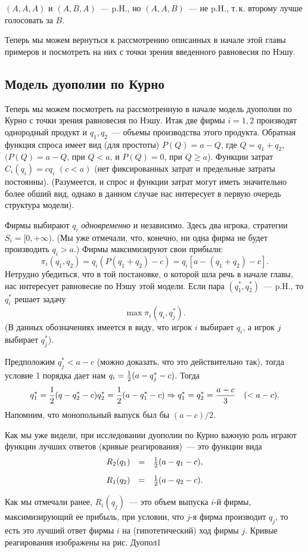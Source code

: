 {$(A,A,A)$ и $(A,B,A)$~--- p.H.,  но $(A,A,B)$~--- не p.H., т.\,к.
второму лучше голосовать за $B$.

Теперь мы можем вернуться к рассмотрению описанных в начале этой
главы примеров и посмотреть на них с точки зрения введенного
равновесия по Нэшу.

\subsection{Модель дуополии по Курно}


Теперь мы можем посмотреть на рассмотренную в начале модель
дуополии по Курно с точки зрения равновесия по Нэшу.
Итак две фирмы $i=1,2$ производят однородный продукт и $q_1,q_2$~---
объемы производства этого продукта. Обратная функция спроса имеет
вид (для простоты) $P(Q)=a-Q$, где $Q=q_1+q_2$, $(P(Q)=a-Q$, при
$Q<a$, и $P(Q)=0$, при $Q\ge a$).  Функции затрат $C_i(q_i)=cq_i$
$(c<a)$ (нет фиксированных затрат и предельные затраты постоянны).
(Разумеется, и спрос и функции затрат могут иметь значительно более
обший вид, однако в данном случае нас интересует в первую очередь
структура модели).

Фирмы выбирают $q_i$ {\it одновременно} и независимо. Здесь два
игрока, стратегии $S_i=[0,+\infty)$. (Мы уже отмечали, что, конечно,
ни одна фирма не будет производить $q_i>a$.) Фирмы максимизируют
свои прибыли:
$$
\pi_i(q_1,q_2)=q_i(P(q_1+q_2)-c)=q_i[a-(q_1+q_2)-c].
$$
Нетрудно убедиться, что в той постановке, о которой шла речь в
начале главы, нас интересует равновесие по Нэшу этой модели. Если
пара $(q^*_1,q^*_2)$~--- p.H., то $q^*_i$ решает задачу
$$
\max\pi_i(q_i,q^*_j).
$$
(В данных обозначениях имеется в виду, что игрок $i$ выбирает $q_i$,
а игрок $j$ выбирает $q^*_j$).


Предположим $q^*_j<a-c$ (можно доказать, что это действительно так),
тогда условие 1 порядка дает нам
$q_i={1\over 2}(a-q^*_j-c)$. Тогда
$$
{q^*_1={1\over 2}(q-q^*_2-c) q^*_2={1\over
2}(a-q^*_1-c)}\Rightarrow q^*_1=q^*_2={{a-c}\over 3}\quad (<a-c).
$$
Напомним, что монопольный выпуск был бы $(a-c)/2$.

Как мы уже видели, при исследовании дуополии по Курно важную роль
играют функции лучших ответов (кривые реагирования)~--- это функции
вида
$$
\begin{array}{rcl}
R_2(q_1)&=&{1\over 2}(a-q_1-c),\\[10pt]
R_1(q_2)&=&{1\over 2}(a-q_2-c). \end{array}
$$

Как мы отмечали ранее, $R_i(q_j)$~--- это объем выпуска $i$-й фирмы,
максимизирующий ее прибыль, при условии, что $j$-я фирма производит
$q_j$, то есть это лучший ответ фирмы $i$ на (гипотетический) ход фирмы $j$.
Кривые реагирования изображены на рис. Дуопол1


}
